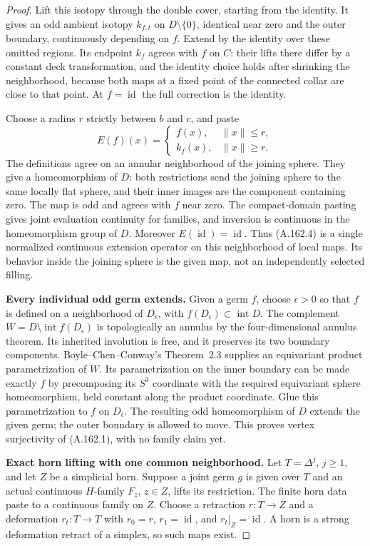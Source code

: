 \begin{proof}
Lift this isotopy through the double cover, starting from the identity.
It gives an odd ambient isotopy $k_{f,t}$ on $D\setminus\{0\}$, identical
near zero and the outer boundary, continuously depending on $f$. Extend
by the identity over these omitted regions. Its endpoint $k_f$ agrees
with $f$ on $C$: their lifts there differ by a constant deck transformation,
and the identity choice holds after shrinking the neighborhood, because
both maps at a fixed point of the connected collar are close to that
point. At $f=\operatorname{id}$ the full correction is the identity.

Choose a radius $r$ strictly between $b$ and $c$, and paste
\[
 E(f)(x)=
 \begin{cases}
 f(x),&\|x\|\le r,\\
 k_f(x),&\|x\|\ge r.
 \end{cases}
 \tag{A.162.4}
\]
The definitions agree on an annular neighborhood of the joining sphere.
They give a homeomorphism of $D$: both restrictions send the joining
sphere to the same locally flat sphere, and their inner images are the
component containing zero. The map is odd and agrees with $f$ near zero.
The compact-domain pasting gives joint evaluation continuity for families,
and inversion is continuous in the homeomorphism group of $D$.
Moreover $E(\operatorname{id})=\operatorname{id}$. Thus (A.162.4) is a
single normalized continuous extension operator on this neighborhood of
local maps. Its behavior inside the joining sphere is the given map,
not an independently selected filling.

\textbf{Every individual odd germ extends.}\quad
Given a germ $f$, choose $\epsilon>0$ so that $f$ is defined on a
neighborhood of $D_\epsilon$, with $f(D_\epsilon)\subset\operatorname{int}D$.
The complement
$W=D\setminus\operatorname{int}f(D_\epsilon)$ is topologically an annulus
by the four-dimensional annulus theorem. Its inherited involution is free,
and it preserves its two boundary components. Boyle--Chen--Conway's
Theorem~2.3 supplies an equivariant product parametrization of $W$.
Its parametrization on the inner boundary can be made exactly $f$ by
precomposing its $S^3$ coordinate with the required equivariant sphere
homeomorphism, held constant along the product coordinate. Glue this
parametrization to $f$ on $D_\epsilon$. The resulting odd homeomorphism
of $D$ extends the given germ; the outer boundary is allowed to move.
This proves vertex surjectivity of (A.162.1), with no family claim yet.

\textbf{Exact horn lifting with one common neighborhood.}\quad
Let $T=\Delta^j$, $j\ge1$, and let $Z$ be a simplicial horn. Suppose a
joint germ $g$ is given over $T$ and an actual continuous $H$-family
$F_z$, $z\in Z$, lifts its restriction. The finite horn data paste to a
continuous family on $Z$. Choose a retraction $r:T\to Z$ and a deformation
$r_t:T\to T$ with $r_0=r$, $r_1=\operatorname{id}$, and $r_t|_Z=\operatorname{id}$.
A horn is a strong deformation retract of a simplex, so such maps exist.


\end{proof}
